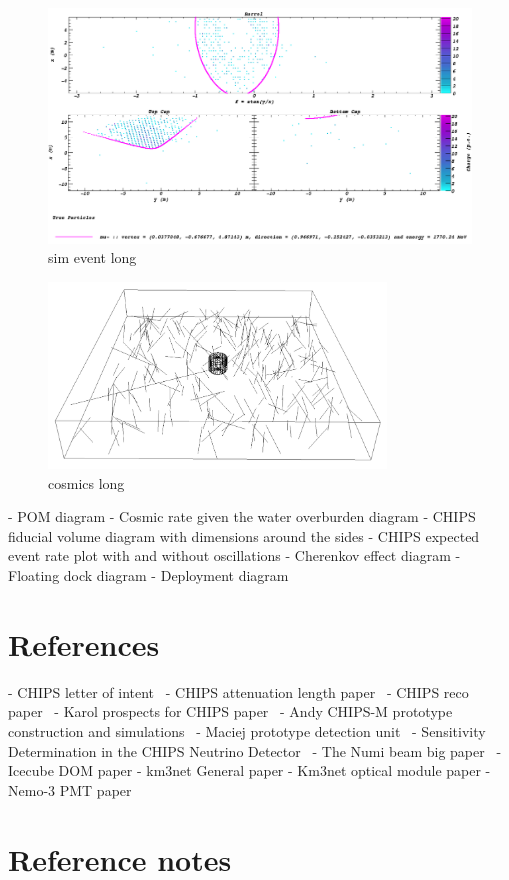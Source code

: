\begin{figure}
    \includegraphics[width=\textwidth]{diagrams/4-chips/sim_event.png}
    \caption[sim event short]
    {sim event long}
    \label{fig:sim_event}
\end{figure}

\begin{figure}
    \includegraphics[width=0.8\textwidth]{diagrams/4-chips/cosmics.png}
    \caption[cosmics short]
    {cosmics long}
    \label{fig:cosmics}
\end{figure}

- POM diagram
- Cosmic rate given the water overburden diagram
- CHIPS fiducial volume diagram with dimensions around the sides
- CHIPS expected event rate plot with and without oscillations
- Cherenkov effect diagram
- Floating dock diagram
- Deployment diagram

\section{References}

- CHIPS letter of intent~\cite{adamson2013}
- CHIPS attenuation length paper~\cite{amat2017}
- CHIPS reco paper~\cite{blake2016}
- Karol prospects for CHIPS paper~\cite{lang2015}
- Andy CHIPS-M prototype construction and simulations~\cite{perch2015}
- Maciej prototype detection unit~\cite{pfutznerProto2017}
- Sensitivity Determination in the CHIPS Neutrino Detector~\cite{adde2016}
- The Numi beam big paper~\cite{adamson2016}
- Icecube DOM paper
- km3net General paper
- Km3net optical module paper
- Nemo-3 PMT paper

\section{Reference notes}

